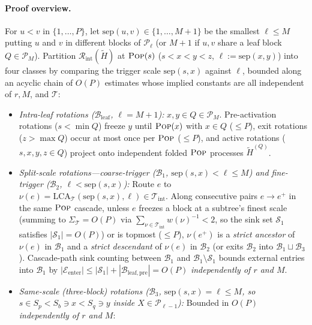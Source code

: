 \documentclass[11pt]{article}
\theoremstyle{definition}
\theoremstyle{remark}
\newcommand{\LCA}{\mathrm{LCA}}
\newcommand{\sep}{\mathrm{sep}}
\newcommand{\POP}{\textnormal{\scshape Pop}}
\begin{document}
\paragraph{Proof overview.}
For $u < v$ in $\{1, \dots, P\}$, let $\sep(u, v) \in \{1, \dots, M + 1\}$ be the smallest $\ell \le M$ putting $u$ and $v$ in different blocks of $\mathcal{P}_\ell$ (or $M + 1$ if $u, v$ share a leaf block $Q \in \mathcal{P}_M$). Partition $\mathcal{R}_{\mathrm{int}}(\widetilde{H})$ at $\POP(s)$ ($s < x < y < z$, $\ell := \sep(x, y)$) into four classes by comparing the trigger scale $\sep(s, x)$ against $\ell$, bounded along an acyclic chain of $O(P)$ estimates whose implied constants are all independent of $r, M$, and $\mathcal{T}$:
\begin{itemize}[leftmargin=2em]
  \item \emph{Intra-leaf rotations ($\mathcal{B}_{\mathrm{leaf}}$, $\ell = M + 1$):} $x, y \in Q \in \mathcal{P}_M$. Pre-activation rotations ($s < \min Q$) freeze $y$ until $\POP(x)$ with $x \in Q$ ($\le P$), exit rotations ($z > \max Q$) occur at most once per $\POP$ ($\le P$), and active rotations ($s, x, y, z \in Q$) project onto independent folded $\POP$ processes $\widetilde{H}^{(Q)}$.
  \item \emph{Split-scale rotations---coarse-trigger ($\mathcal{B}_1$, $\sep(s, x) < \ell \le M$) and fine-trigger ($\mathcal{B}_2$, $\ell < \sep(s, x)$):} Route $e$ to $\nu(e) = \LCA_{\mathcal{T}}(\sep(s, x), \ell) \in \mathcal{T}_{\mathrm{int}}$. Along consecutive pairs $e \to e^+$ in the same $\POP$ cascade, unless $e$ freezes a block at a subtree's finest scale (summing to $\Sigma_{\mathcal{T}} = O(P)$ via $\sum_{\nu \in \mathcal{T}_{\mathrm{int}}} w(\nu)^{-1} < 2$, so the sink set $\mathcal{S}_1$ satisfies $|\mathcal{S}_1| = O(P)$) or is topmost ($\le P$), $\nu(e^+)$ is a \emph{strict ancestor} of $\nu(e)$ in $\mathcal{B}_1$ and a \emph{strict descendant} of $\nu(e)$ in $\mathcal{B}_2$ (or exits $\mathcal{B}_2$ into $\mathcal{B}_1 \sqcup \mathcal{B}_3$). Cascade-path sink counting between $\mathcal{B}_1$ and $\mathcal{B}_1 \setminus \mathcal{S}_1$ bounds external entries into $\mathcal{B}_1$ by $|\mathcal{E}_{\mathrm{enter}}| \le |\mathcal{S}_1| + |\mathcal{B}_{\mathrm{leaf, pre}}| = O(P)$ \emph{independently of $r$ and $M$}.
  \item \emph{Same-scale (three-block) rotations ($\mathcal{B}_3$, $\sep(s, x) = \ell \le M$, so $s \in S_p < S_b \ni x < S_q \ni y$ inside $X \in \mathcal{P}_{\ell-1}$):} Bounded in $O(P)$ \emph{independently of $r$ and $M$}:
    \begin{enumerate}[label=(\roman*)]

\end{enumerate}
\end{itemize}
\end{document}
